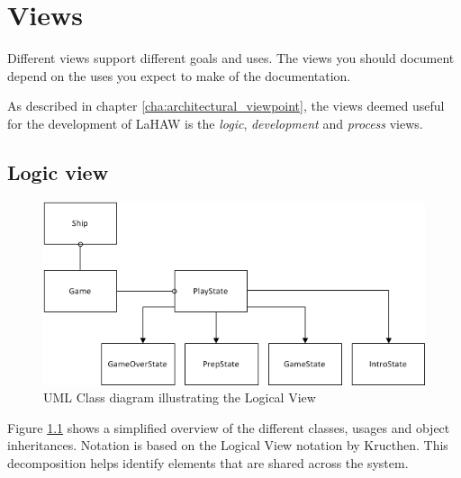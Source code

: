 \chapter{Views}


Different views support different goals and uses.
The views you should document depend on the uses you expect to make of the documentation.



As described in chapter \ref{cha:architectural_viewpoint}, the views deemed useful for the development of LaHAW is the \emph{logic}, \emph{development} and \emph{process} views.





\section{Logic view}


\begin{figure}[ht]
    \includegraphics[width=\textwidth]{LogicalView.png}
    \caption{UML Class diagram illustrating the Logical View}
    \label{fig:LogicalView}
\end{figure}

Figure \ref{fig:LogicalView} shows a simplified overview of the different classes, usages and object inheritances. Notation is based on the Logical View notation by Kructhen\cite{kruchten}. This decomposition helps identify elements that are shared across the system.





